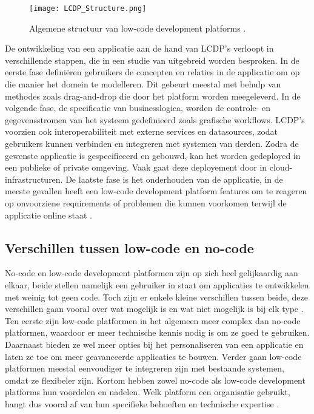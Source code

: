 \begin{figure}[hb]
    \centering
    \texttt{[image: LCDP\_Structure.png]}
    \caption[Structuur low-code platforms]{Algemene structuur van low-code development platforms \autocite{Sahay2020}.}
    \label{fig:lcdp_structure}
\end{figure}

De ontwikkeling van een applicatie aan de hand van LCDP's verloopt in verschillende stappen, die in een studie van \textcite{Ruscio2022} uitgebreid worden besproken. In de eerste fase definiëren gebruikers de concepten en relaties in de applicatie om op die manier het domein te modelleren. Dit gebeurt meestal met behulp van methodes zoals drag-and-drop die door het platform worden meegeleverd. In de volgende fase, de specificatie van businesslogica, worden de controle- en gegevensstromen van het systeem gedefinieerd zoals grafische workflows. LCDP's voorzien ook interoperabiliteit met externe services en datasources, zodat gebruikers kunnen verbinden en integreren met systemen van derden. Zodra de gewenste applicatie is gespecificeerd en gebouwd, kan het worden gedeployed in een publieke of private omgeving. Vaak gaat deze deployement door in cloud-infrastructuren. De laatste fase is het onderhouden van de applicatie, in de meeste gevallen heeft een low-code development platform features om te reageren op onvoorziene requirements of problemen die kunnen voorkomen terwijl de applicatie online staat . \\

\subsection{Verschillen tussen low-code en no-code}
\label{subsec:verschillen_low_code}

No-code en low-code development platformen zijn op zich heel gelijkaardig aan elkaar, beide stellen namelijk een gebruiker in staat om applicaties te ontwikkelen met weinig tot geen code. Toch zijn er enkele kleine verschillen tussen beide, deze verschillen gaan vooral over wat mogelijk is en wat niet mogelijk is bij elk type \autocite{Yan2021}. Ten eerste zijn low-code platformen in het algemeen meer complex dan no-code platformen, waardoor er meer technische kennis nodig is om ze goed te gebruiken. Daarnaast bieden ze wel meer opties bij het personaliseren van een applicatie en laten ze toe om meer geavanceerde applicaties te bouwen. Verder gaan low-code platformen meestal eenvoudiger te integreren zijn met bestaande systemen, omdat ze flexibeler zijn. Kortom hebben zowel no-code als low-code development platforms hun voordelen en nadelen. Welk platform een organisatie gebruikt, hangt dus vooral af van hun specifieke behoeften en technische expertise \autocite{Yan2021}.

